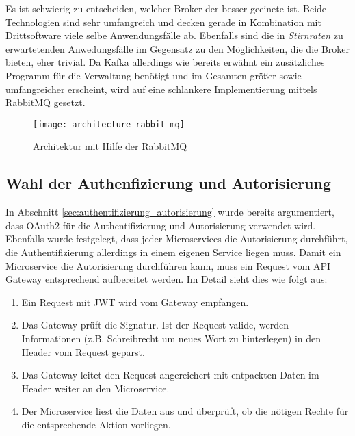 {Es ist schwierig zu entscheiden, welcher Broker der besser geeinete ist. Beide Technologien sind sehr umfangreich und decken gerade in Kombination mit Drittsoftware viele selbe Anwendungsfälle ab. Ebenfalls sind die in \textit{Stirnraten} zu erwartetenden Anwedungsfälle im Gegensatz zu den Möglichkeiten, die die Broker bieten, eher trivial. Da Kafka allerdings wie bereits erwähnt ein zusätzliches Programm für die Verwaltung benötigt und im Gesamten größer sowie umfangreicher erscheint, wird auf eine schlankere Implementierung mittels RabbitMQ gesetzt.\\

\begin{figure}[ht]
	\centering
	\texttt{[image: architecture\_rabbit\_mq]}
	\caption[Architektur mit Hilfe von RabbitMQ] {Architektur mit Hilfe der RabbitMQ}
	\label{fig:architecture_rabbit_mq}
\end{figure}

\subsection{Wahl der Authenfizierung und Autorisierung} \label{sec:concept_authentifizierung_autorisierung}

In Abschnitt \ref{sec:authentifizierung_autorisierung} wurde bereits argumentiert, dass OAuth2 für die Authentifizierung und Autorisierung verwendet wird. Ebenfalls wurde festgelegt, dass jeder Microservices die Autorisierung durchführt, die Authentifizierung allerdings in einem eigenen Service liegen muss. Damit ein Microservice die Autorisierung durchführen kann, muss ein Request vom API Gateway entsprechend aufbereitet werden. Im Detail sieht dies wie folgt aus\cite{richardson2019mic_pattern}:\\
\begin{enumerate}
	\item  Ein Request mit JWT wird vom Gateway empfangen.
	\item Das Gateway prüft die Signatur. Ist der Request valide, werden Informationen (z.B. Schreibrecht um neues Wort zu hinterlegen) in den Header vom Request geparst. 
	\item Das Gateway leitet den Request angereichert mit entpackten Daten im Header weiter an den Microservice.
	\item Der Microservice liest die Daten aus und überprüft, ob die nötigen Rechte für die entsprechende Aktion vorliegen.
\end{enumerate}

}
